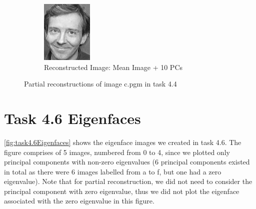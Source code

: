 \documentclass[12pt]{article}
\begin{document}
\begin{figure}
\begin{subfigure}[b]{0.20\textwidth}
		\includegraphics[width=\textwidth]{Task4.3_Images/ReconstructedImage10.jpg}
		\caption{Reconstructed Image: Mean Image + 10 PCs}
	\end{subfigure}\quad
	\caption[Plots of partial reconstructions of image c.pgm in task 4.4]{\label{fig:task4.4ReconstructedImages} Partial reconstructions of image c.pgm in task 4.4}
\end{figure}


\newpage
\thispagestyle{plain}
\mbox{}

\section {Task 4.6 Eigenfaces}
\label{sec:task4.6Eigenfaces}

\cref{fig:task4.6Eigenfaces} shows the eigenface images we created in task 4.6. The figure comprises of 5 images, numbered from 0 to 4, since we plotted only principal components with non-zero eigenvalues (6 principal components existed in total as there were 6 images labelled from a to f, but one had a zero eigenvalue). Note that for partial reconstruction, we did not need to consider the principal component with zero eigenvalue, thus we did not plot the eigenface associated with the zero eigenvalue in this figure.
\end{document}
